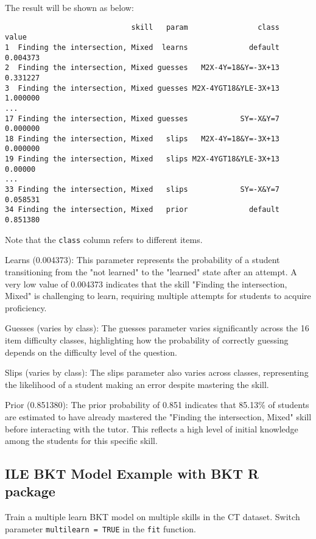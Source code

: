 \documentclass{article}
\begin{document}
The result will be shown as below:

\begin{verbatim}
                             skill   param                class    value
1  Finding the intersection, Mixed  learns              default 0.004373
2  Finding the intersection, Mixed guesses   M2X-4Y=18&Y=-3X+13 0.331227
3  Finding the intersection, Mixed guesses M2X-4YGT18&YLE-3X+13 1.000000
...
17 Finding the intersection, Mixed guesses            SY=-X&Y=7 0.000000
18 Finding the intersection, Mixed   slips   M2X-4Y=18&Y=-3X+13 0.000000
19 Finding the intersection, Mixed   slips M2X-4YGT18&YLE-3X+13 0.00000
...
33 Finding the intersection, Mixed   slips            SY=-X&Y=7 0.058531
34 Finding the intersection, Mixed   prior              default 0.851380
\end{verbatim}
    
Note that the \texttt{class} column refers to different items.

Learns (0.004373): This parameter represents the probability of a student transitioning from the "not learned" to the "learned" state after an attempt. A very low value of 0.004373 indicates that the skill "Finding the intersection, Mixed" is challenging to learn, requiring multiple attempts for students to acquire proficiency.

Guesses (varies by class): The guesses parameter varies significantly across the 16 item difficulty classes, highlighting how the probability of correctly guessing depends on the difficulty level of the question.

Slips (varies by class): The slips parameter also varies across classes, representing the likelihood of a student making an error despite mastering the skill.

Prior (0.851380): The prior probability of 0.851 indicates that 85.13\% of students are estimated to have already mastered the "Finding the intersection, Mixed" skill before interacting with the tutor. This reflects a high level of initial knowledge among the students for this specific skill.

\subsection{ILE BKT Model Example with BKT R package}

Train a multiple learn BKT model on multiple skills in the CT dataset. Switch parameter \texttt{multilearn = TRUE} in the \texttt{fit} function.
\end{document}
